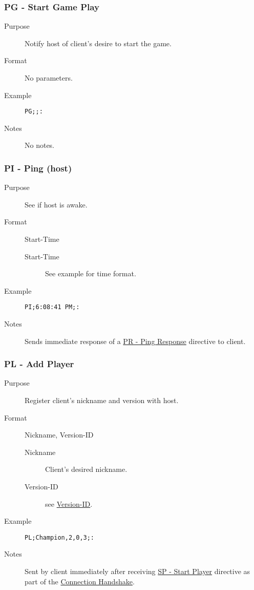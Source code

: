 \documentclass{article}
\providecommand{\wiredata}[1]{\texttt{{#1}}}
\begin{document}

\subsubsection{PG - Start Game Play} %
\label{ssub:pg_start_game_play}

\begin{description}
  \item[Purpose] Notify host of client's desire to start the game.
  \item[Format] No parameters.
  \item[Example] \wiredata{PG;;:}
  \item[Notes] No notes.
\end{description}


\subsubsection{PI - Ping (host)} %
\label{ssub:pi_ping_host_}

\begin{description}
  \item[Purpose] See if host is awake.
  \item[Format] Start-Time
  \begin{description}
    \item[Start-Time] See example for time format.
  \end{description}
  \item[Example] \wiredata{PI;6:08:41 PM;:}
  \item[Notes] Sends immediate response of a \hyperref[ssub:pr_ping_response_client_]{PR - Ping Response} directive to client.
\end{description}


\subsubsection{PL - Add Player} %
\label{ssub:pl_add_player}

\begin{description}
  \item[Purpose] Register client's nickname and version with host.
  \item[Format] Nickname, Version-ID
  \begin{description}
    \item[Nickname] Client's desired nickname.
    \item[Version-ID] see \hyperref[ssub:version_id]{Version-ID}.
  \end{description}
  \item[Example] \wiredata{PL;Champion,2,0,3;:}
  \item[Notes] Sent by client immediately after receiving \hyperref[ssub:sp_start_player]{SP - Start Player} directive as part of the \hyperref[sub:connection_handshake]{Connection Handshake}.
\end{description}
\end{document}
